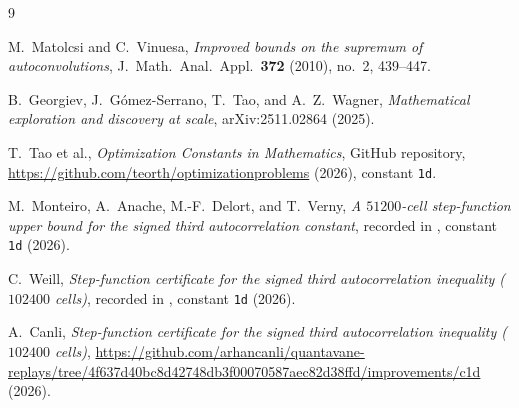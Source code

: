 \documentclass[11pt]{article}
\begin{document}
\begin{thebibliography}{9}

M.~Matolcsi and C.~Vinuesa,
\emph{Improved bounds on the supremum of autoconvolutions},
J.\ Math.\ Anal.\ Appl.\ \textbf{372} (2010), no.~2, 439--447.

B.~Georgiev, J.~G\'omez-Serrano, T.~Tao, and A.~Z.~Wagner,
\emph{Mathematical exploration and discovery at scale},
arXiv:2511.02864 (2025).

T.~Tao et al.,
\emph{Optimization Constants in Mathematics},
GitHub repository,\\
\url{https://github.com/teorth/optimizationproblems} (2026), constant \texttt{1d}.

M.~Monteiro, A.~Anache, M.-F.~Delort, and T.~Verny,
\emph{A $51200$-cell step-function upper bound for the signed third autocorrelation constant},
recorded in \cite{Tao2026}, constant \texttt{1d} (2026).

C.~Weill,
\emph{Step-function certificate for the signed third autocorrelation inequality ($102400$ cells)},
recorded in \cite{Tao2026}, constant \texttt{1d} (2026).

A.~Canli,
\emph{Step-function certificate for the signed third autocorrelation inequality ($102400$ cells)},
\url{https://github.com/arhancanli/quantavane-replays/tree/4f637d40bc8d42748db3f00070587aec82d38ffd/improvements/c1d} (2026).

\end{thebibliography}
\end{document}
